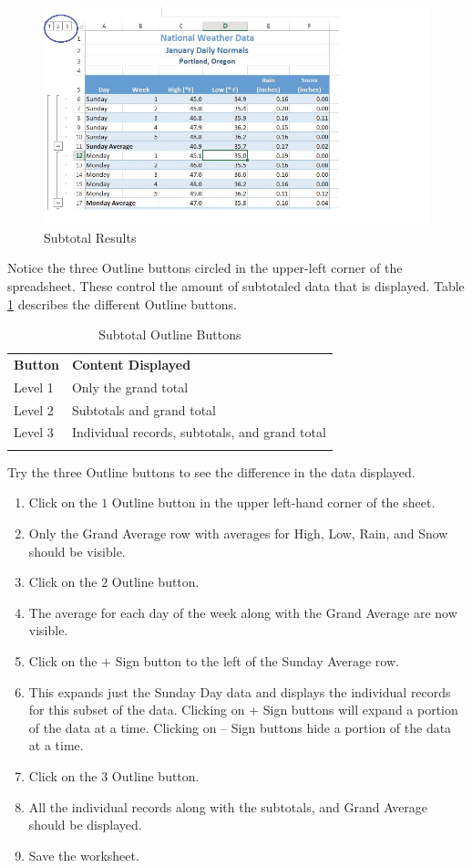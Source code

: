 \begin{figure}[H]
	\centering
	\includegraphics[width=\maxwidth{.95\linewidth}]{gfx/ch05_fig25}
	\caption{Subtotal Results}
	\label{05:fig25}
\end{figure}

Notice the three Outline buttons circled in the upper-left corner of the spreadsheet. These control the amount of subtotaled data that is displayed. Table \ref{05:tab06} describes the different Outline buttons.

{\small
	\begin{longtable}{p{0.50in}p{3.00in}} %
		\textbf{Button} & \textbf{Content Displayed} \endhead
		\hline \\
		Level 1 & Only the grand total\\
		Level 2 & Subtotals and grand total\\
		Level 3 & Individual records, subtotals, and grand total\\
		\caption{Subtotal Outline Buttons}
		\label{05:tab06}
	\end{longtable}
}

Try the three Outline buttons to see the difference in the data displayed.

\begin{enumerate}
	\item Click on the $ 1 $ Outline button in the upper left-hand corner of the sheet.
	\item Only the Grand Average row with averages for High, Low, Rain, and Snow should be visible.
	\item Click on the $ 2 $ Outline button.
	\item The average for each day of the week along with the Grand Average are now visible.
	\item Click on the + Sign button to the left of the Sunday Average row.
	\item This expands just the Sunday Day data and displays the individual records for this subset of the data. Clicking on + Sign buttons will expand a portion of the data at a time. Clicking on – Sign buttons hide a portion of the data at a time.
	\item Click on the $ 3 $ Outline button.
	\item All the individual records along with the subtotals, and Grand Average should be displayed. 
	\item Save the worksheet.
\end{enumerate}

